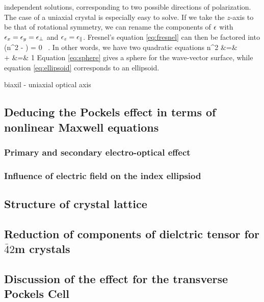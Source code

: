 independent solutions, corresponding to two possible directions of polarization. 
The case of a uniaxial crystal is especially easy to solve. If we take the 
$z$-axis to be that of rotational symmetry, we can rename the components of 
$\mathbf{\epsilon}$ with $\epsilon_x = \epsilon_y = \epsilon_\perp$ and $\epsilon_z = \epsilon_\parallel$. 
Fresnel's equation \eqref{eq:fresnel} can then be factored into
\beq
    \left(n^2 - \frac{\eps_\perp}{\epsn}\right) 
     = 0 \, .
\eeq
In other words, we have two quadratic equations
\bea
    n^2 &=& \frac{\eps_\perp}{\epsn} 
    \label{eq:sphere}\\
     +  &=& 1
    \label{eq:ellipsoid}
\eea
Equation \eqref{eq:sphere} gives a sphere for the wave-vector surface, while 
equation \eqref{eq:ellipsoid} corresponds to an ellipsoid. 

biaxil - uniaxial 
optical axis 


\subsection{Deducing the Pockels effect in terms of nonlinear Maxwell equations}
\subsubsection{Primary and secondary electro-optical effect}
\subsubsection{Influence of electric field on the index ellipsiod}

\subsection{Structure of crystal lattice}

\subsection{Reduction of components of dielctric tensor for $\bar{4}2$m crystals}

\subsection{Discussion of the effect for the transverse Pockels Cell}

